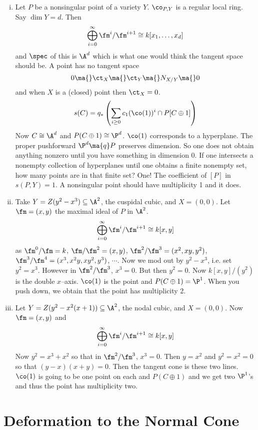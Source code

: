 \begin{ex}
\begin{enumerate}[(i)]
\item Let $P$ be a nonsingular point of a variety $Y$. $\co_{P,Y}$ is a regular local ring. Say $\dim Y=d$. Then 
	\[
	\bigoplus_{i=0}^\infty \fm^i/\fm^{i+1} \cong k[x_1,\ldots,x_d]
	\]
and $\spec$ of this is $\A^d$ which is what one would think the tangent space should be. A point has no tangent space
	\[
	0 \ma{} \ct_X \ma{} \ct_Y \ma{} N_{X/Y} \ma{} 0
	\]
and when $X$ is a (closed) point then $\ct_X=0$.
	\[
	s(C)=q_*\left(\sum_{i \geq 0} c_1(\co(1))^i \cap P[C \oplus 1]\right)
	\]
Now $C \cong \A^d$ and $P(C \oplus 1) \cong \P^d$. $\co(1)$ corresponds to a hyperplane. The proper pushforward $\P^d \ma{q} P$ preserves dimension. So one does not obtain anything nonzero until you have something in dimension 0. If one intersects a nonempty collection of hyperplanes until one obtains a finite nonempty set, how many points are in that finite set? One! The coefficient of $[P]$ in $s(P,Y)=1$. A nonsingular point should have multiplicity 1 and it does.

\item Take $Y=Z(y^2-x^3) \subseteq \A^2$, the cuspidal cubic, and $X=(0,0)$. Let $\fm=(x,y)$ the maximal ideal of $P$ in $\A^2$.
	\[
	\bigoplus_{i=0}^\infty \fm^i/\fm^{i+1} \cong k[x,y]
	\]
as $\fm^0/\fm=k$, $\fm/\fm^2=(x,y)$, $\fm^2/\fm^3=(x^2,xy,y^2)$, $\fm^3/\fm^4=(x^3,x^2y,xy^2,y^3)$, $\cdots$. Now we mod out by $y^2-x^3$, i.e. set $y^2=x^3$. However in $\fm^2/\fm^3$, $x^3=0$. But then $y^2=0$. Now $k[x,y]/(y^2)$ is the double $x$--axis. $\co(1)$ is the point and $P(C \oplus 1)=\P^1$. When you push down, we obtain that the point has multiplicity 2.

\item Let $Y=Z(y^2-x^2(x+1)) \subseteq \A^2$, the nodal cubic, and $X=(0,0)$. Now $\fm=(x,y)$ and 	\[
	\bigoplus_{i=0}^\infty \fm^i/\fm^{i+1} \cong k[x,y]
	\]
Now $y^2=x^3+x^2$ so that in $\fm^2/\fm^3$, $x^3=0$. Then $y=x^2$ and $y^2=x^2=0$ so that $(y-x)(x+y)=0$. Then the tangent cone is these two lines. $\co(1)$ is going to be one point on each and $P(C \oplus 1)$ and we get two $\P^1$'s and thus the point has multiplicity two. 
\end{enumerate}
\end{ex}




\section{Deformation to the Normal Cone}

